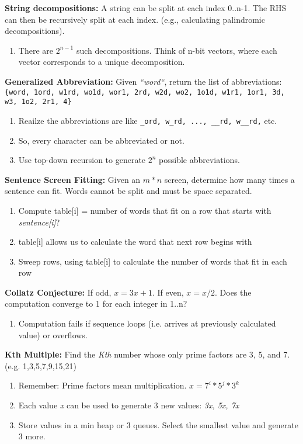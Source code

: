 \documentclass[12pt]{article}
\begin{document}
\vspace{5mm}
\noindent
\textbf{String decompositions:}
A string can be split at each index 0..n-1. The RHS can then be recursively split at each index.
(e.g., calculating palindromic decompositions).
\begin{enumerate}
\item There are $2^{n-1}$ such decompositions. Think of n-bit vectors, where each vector corresponds to a unique decomposition.  
\end{enumerate}


\vspace{5mm}
\noindent
\textbf{Generalized Abbreviation:}
Given \emph{``word``}, return the list of abbreviations: \texttt{\{word,
1ord, w1rd, wo1d, wor1, 2rd, w2d, wo2, 1o1d, w1r1, 1or1, 3d, w3, 1o2, 2r1, 4\}}
\begin{enumerate}
\item Reailze the abbreviations are like \texttt{\_ord, w\_rd, ..., \_\_rd, w\_\_rd,} etc.
\item So, every character can be abbreviated or not.
\item Use top-down recursion to generate $2^{n}$ possible abbreviations.
\end{enumerate}


\vspace{5mm}
\noindent
\textbf{Sentence Screen Fitting:}
Given an $m * n$ screen, determine how many times a sentence can fit. Words cannot be split and must be space separated.
\begin{enumerate}
\item Compute table[i] = number of words that fit on a row that starts with \emph{sentence[i]}?
\item table[i] allows us to calculate the word that next row begins with
\item Sweep rows, using table[i] to calculate the number of words that fit in each row
\end{enumerate}


\vspace{5mm}
\noindent
\textbf{Collatz Conjecture:}
If odd, $x = 3x + 1$. If even, $x  = x / 2$. Does the computation converge to 1 for each integer in 1..n?
\begin{enumerate}
\item Computation fails if sequence loops (i.e. arrives at previously calculated value) or overflows.
\end{enumerate}


\vspace{5mm}
\noindent
\textbf{Kth Multiple:}
Find the \emph{Kth} number whose only prime factors are 3, 5, and 7. (e.g. 1,3,5,7,9,15,21)
\begin{enumerate}
\item Remember: Prime factors mean multiplication. $x = 7^i * 5^j * 3^k$
\item Each value \emph{x} can be used to generate 3 new values: \emph{3x, 5x, 7x}
\item Store values in a min heap or 3 queues. Select the smallest value and generate 3 more.
\end{enumerate}
\end{document}
